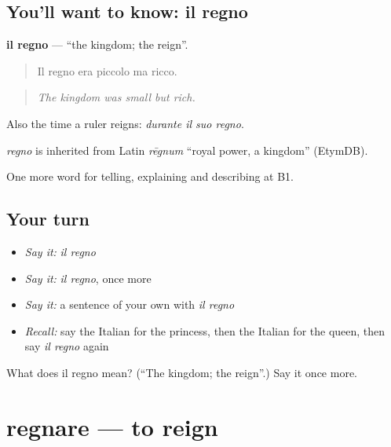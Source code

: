 \subsection*{You'll want to know: il regno}
\textbf{il regno} — \textquotedblleft{}the kingdom; the reign\textquotedblright{}.

\begin{quote}
Il regno era piccolo ma ricco.
\end{quote}

\begin{quote}
\emph{The kingdom was small but rich.}
\end{quote}

Also the time a ruler reigns: \emph{durante il suo regno}.

\begin{cousinweb}
\emph{regno} is inherited from Latin \emph{rēgnum} \textquotedblleft{}royal power, a kingdom\textquotedblright{} (EtymDB).
\end{cousinweb}

\begin{grammarlens}[title={What you've built}]
One more word for telling, explaining and describing at B1.
\end{grammarlens}

\subsection*{Your turn}
\begin{itemize}
\raggedright
  \item \emph{Say it:} \emph{il regno}
  \item \emph{Say it:} \emph{il regno}, once more
  \item \emph{Say it:} a sentence of your own with \emph{il regno}
  \item \emph{Recall:} say the Italian for the princess, then the Italian for the queen, then say \emph{il regno} again
\end{itemize}

\begin{tcolorbox}[breakable,colback=teal!4,colframe=teal!35!black,title={Before you move on}]
What does il regno mean? (\textquotedblleft{}The kingdom; the reign\textquotedblright{}.) Say it once more.
\end{tcolorbox}
\section[regnare]{regnare — to reign}

